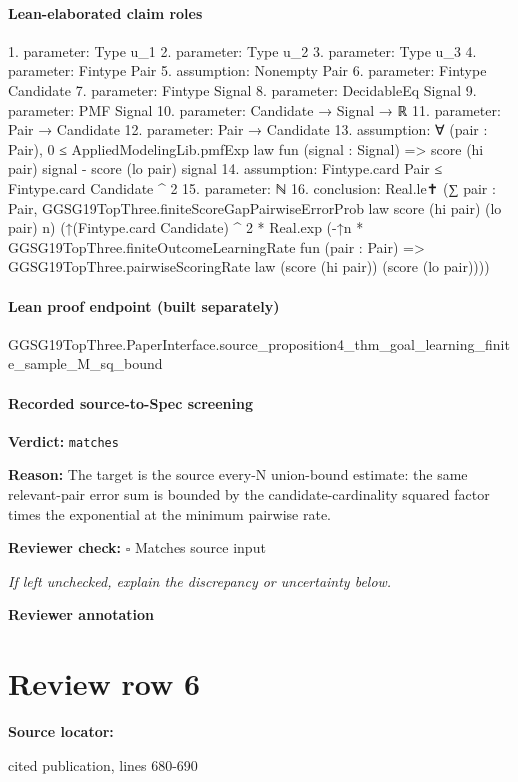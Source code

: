 \documentclass[10pt]{article}
\newcommand{\reviewerbox}{%
  \par\noindent\fbox{\parbox{0.96\linewidth}{\rule{0pt}{0.38in}}}\par
}
\newcommand{\reviewmatch}[1]{%
  \par\noindent\textbf{Reviewer check:} $\square$\; #1\par
  \noindent\emph{If left unchecked, explain the discrepancy or uncertainty below.}\par
}
\begin{document}
\paragraph{Lean-elaborated claim roles}\begin{ReviewVerbatim}
1. parameter: Type u_1
2. parameter: Type u_2
3. parameter: Type u_3
4. parameter: Fintype Pair
5. assumption: Nonempty Pair
6. parameter: Fintype Candidate
7. parameter: Fintype Signal
8. parameter: DecidableEq Signal
9. parameter: PMF Signal
10. parameter: Candidate → Signal → ℝ
11. parameter: Pair → Candidate
12. parameter: Pair → Candidate
13. assumption: ∀ (pair : Pair),
  0 ≤ AppliedModelingLib.pmfExp law fun (signal : Signal) => score (hi pair) signal - score (lo pair) signal
14. assumption: Fintype.card Pair ≤ Fintype.card Candidate ^ 2
15. parameter: ℕ
16. conclusion: Real.le✝ (∑ pair : Pair, GGSG19TopThree.finiteScoreGapPairwiseErrorProb law score (hi pair) (lo pair) n)
  (↑(Fintype.card Candidate) ^ 2 *
    Real.exp
      (-↑n *
        GGSG19TopThree.finiteOutcomeLearningRate fun (pair : Pair) =>
          GGSG19TopThree.pairwiseScoringRate law (score (hi pair)) (score (lo pair))))
\end{ReviewVerbatim}

\paragraph{Lean proof endpoint (built separately)}\begin{ReviewVerbatim}
GGSG19TopThree.PaperInterface.source_proposition4_thm_goal_learning_finite_sample_M_sq_bound
\end{ReviewVerbatim}

\paragraph{Recorded source-to-Spec screening}
\textbf{Verdict:} \texttt{matches}
\\
{\raggedright
\textbf{Reason:} The target is the source every-\allowbreak{}N union-\allowbreak{}bound estimate:\allowbreak{} the same relevant-\allowbreak{}pair error sum is bounded by the candidate-\allowbreak{}cardinality squared factor times the exponential at the minimum pairwise rate.\allowbreak{}
\par}
\reviewmatch{Matches source input}
\noindent\textbf{Reviewer annotation}\par
\reviewerbox
\clearpage
\hypertarget{source-claim-f4c362962779355c}{}
\section*{Review row 6}
\textbf{Source locator:} {\footnotesize\raggedright cited publication, lines 680-\allowbreak{}690\par}
\end{document}
